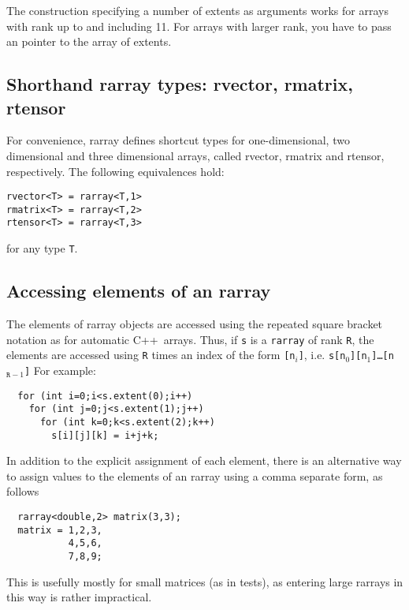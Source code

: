 \documentclass[11pt,twoside]{article}
\newcommand{\cxx}{C{++}}
\begin{document}
The construction specifying a number of extents as arguments works for arrays with rank up to and including 11. For arrays with larger rank, you have to pass an pointer to the array of extents.

\subsection{Shorthand rarray types: rvector, rmatrix, rtensor}

For convenience, rarray defines shortcut types for
one-dimensional, two dimensional and three dimensional arrays, called
rvector, rmatrix and rtensor, respectively. The following equivalences hold:

\begin{framed}\vspace{-18pt}%
\begin{verbatim}
rvector<T> = rarray<T,1>
rmatrix<T> = rarray<T,2>
rtensor<T> = rarray<T,3>
\end{verbatim}
\vspace{-18pt}\end{framed}\noindent
for any type \texttt{T}.

\subsection{Accessing elements of an rarray}

The elements of rarray objects are accessed using the repeated square
bracket notation as for automatic \cxx\ arrays. Thus, if \texttt{s} is a \texttt{rarray} of rank \texttt R, the elements are accessed using \texttt{R} times an index of the form \texttt{[n$_i$]}, i.e. \texttt{s[n$_0$][n$_1$]\dots[n$_{\texttt{R}-1}$]}
For example:\vspace{-9pt}
\begin{framed}\vspace{-18pt}%
\begin{verbatim}
  for (int i=0;i<s.extent(0);i++)
    for (int j=0;j<s.extent(1);j++)
      for (int k=0;k<s.extent(2);k++)
        s[i][j][k] = i+j+k;
\end{verbatim}%
\vspace{-12pt}
\end{framed}%

In addition to the explicit assignment of each element, there is an
alternative way to assign values to the elements of an rarray using a
comma separate form, as follows
\vspace{-9pt}
\begin{framed}\vspace{-18pt}%
\begin{verbatim}
  rarray<double,2> matrix(3,3);
  matrix = 1,2,3,
           4,5,6,
           7,8,9;
\end{verbatim}%
\vspace{-12pt}
\end{framed}\vspace{-8pt}\noindent
This is usefully mostly for small matrices (as in tests), as entering
large rarrays in this way is rather impractical.
\end{document}
